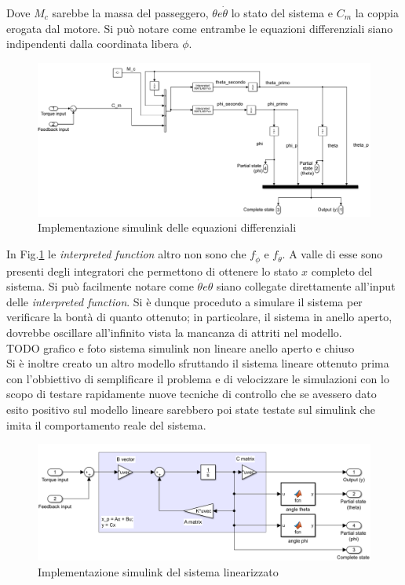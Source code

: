 Dove $M_c$ sarebbe la massa del passeggero, $\theta e \dot{\theta}$ lo stato del sistema e $C_m$  la coppia erogata dal motore. Si può notare come entrambe le equazioni differenziali siano indipendenti dalla coordinata libera $\phi$.
 \begin{figure}[H]
	\centering   	
	\includegraphics[width=1\textwidth]{Immagini/non_linear_system.png}
	\caption{Implementazione simulink delle equazioni differenziali}
	\label{fig:non_linear_system}
\end{figure}
In Fig.\ref{fig:non_linear_system} le \textit{interpreted function} altro non sono che  $f_{\ddot{\phi}}$ e $f_{\ddot{\theta}}$. A valle di esse sono presenti degli integratori che permettono di ottenere lo stato $x$ completo del sistema. Si può facilmente notare come $\dot{\theta} e \theta$ siano collegate direttamente all'input delle \textit{interpreted function}.
Si è dunque proceduto a  simulare il sistema per verificare la bontà di quanto ottenuto; in particolare, il sistema in anello aperto, dovrebbe oscillare all'infinito vista la mancanza di attriti nel modello.
\\
TODO grafico e foto sistema simulink non lineare anello aperto e chiuso
\\
Si è inoltre creato un altro modello sfruttando il sistema lineare ottenuto prima  con l'obbiettivo di semplificare il problema e di velocizzare le simulazioni con lo scopo di testare rapidamente nuove tecniche di controllo che se avessero dato esito positivo sul modello lineare sarebbero poi state testate sul simulink che imita il comportamento reale del sistema.
\begin{figure}[H]
	\centering   	
	\includegraphics[width=1\textwidth]{Immagini/linear_system.png}
	\caption{Implementazione simulink del sistema linearizzato}
	\label{fig:linear_system}
\end{figure}

